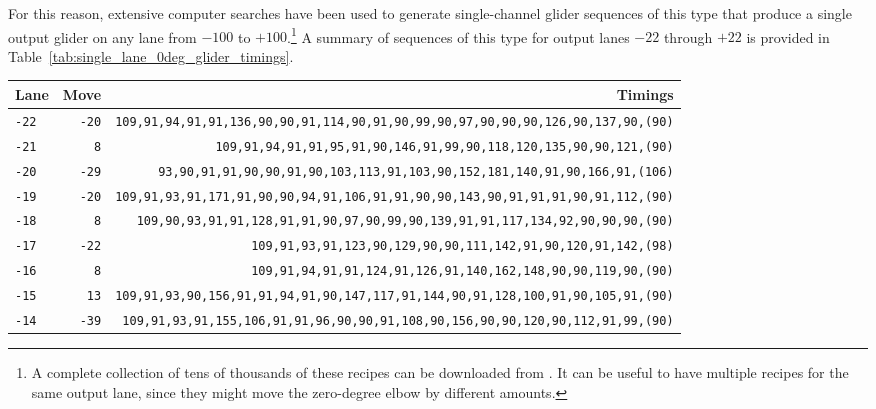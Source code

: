 For this reason, extensive computer searches have been used to generate single-channel glider sequences of this type that produce a single output glider on any lane from $-100$ to $+100$.\footnote{A complete collection of tens of thousands of these recipes can be downloaded from . It can be useful to have multiple recipes for the same output lane, since they might move the zero-degree elbow by different amounts.} A summary of sequences of this type for output lanes $-22$ through $+22$ is provided in Table~\ref{tab:single_lane_0deg_glider_timings}.

\begin{table}[!phtb]
	\centering
	\begin{tabular}{@{\hskip 0.31cm}L@{\hskip 0.27cm}r@{\hskip 0.27cm}R@{\hskip 0.34cm}}\toprule
		Lane & Move & Timings \\\midrule
		\texttt{-22} & \texttt{-20} & \footnotesize\texttt{109,91,94,91,91,136,90,90,91,114,90,91,90,99,90,97,90,90,90,126,90,137,90,{\color{gray}(90)}} \\
		\texttt{-21} & \texttt{8} & \footnotesize\texttt{109,91,94,91,91,95,91,90,146,91,99,90,118,120,135,90,90,121,{\color{gray}(90)}} \\
		\texttt{-20} & \texttt{-29} & \footnotesize\texttt{93,90,91,91,90,90,91,90,103,113,91,103,90,152,181,140,91,90,166,91,{\color{gray}(106)}} \\
		\texttt{-19} & \texttt{-20} & \footnotesize\texttt{109,91,93,91,171,91,90,90,94,91,106,91,91,90,90,143,90,91,91,91,90,91,112,{\color{gray}(90)}} \\
		\texttt{-18} & \texttt{8} & \footnotesize\texttt{109,90,93,91,91,128,91,91,90,97,90,99,90,139,91,91,117,134,92,90,90,90,{\color{gray}(90)}} \\
		\texttt{-17} & \texttt{-22} & \footnotesize\texttt{109,91,93,91,123,90,129,90,90,111,142,91,90,120,91,142,{\color{gray}(98)}} \\
		\texttt{-16} & \texttt{8} & \footnotesize\texttt{109,91,94,91,91,124,91,126,91,140,162,148,90,90,119,90,{\color{gray}(90)}} \\
		\texttt{-15} & \texttt{13} & \footnotesize\texttt{109,91,93,90,156,91,91,94,91,90,147,117,91,144,90,91,128,100,91,90,105,91,{\color{gray}(90)}} \\
		\texttt{-14} & \texttt{-39} & \footnotesize\texttt{109,91,93,91,155,106,91,91,96,90,90,91,108,90,156,90,90,120,90,112,91,99,{\color{gray}(90)}} \\

\end{tabular}
\end{table}
